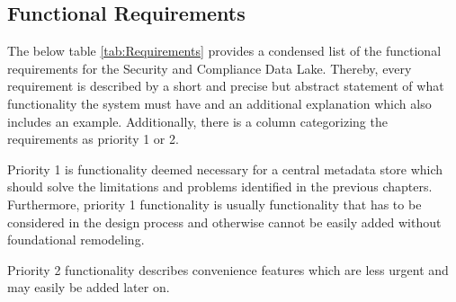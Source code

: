 \subsection{Functional Requirements}
The below table \ref{tab:Requirements} provides a condensed list of the functional requirements for the Security and Compliance Data Lake. Thereby, every requirement is described by a short and precise but abstract statement of what functionality the system must have and an additional explanation which also includes an example. Additionally, there is a column categorizing the requirements as priority 1 or 2.\par 
Priority 1 is functionality deemed necessary for a central metadata store which should solve the limitations and problems identified in the previous chapters. Furthermore, priority 1 functionality is usually functionality that has to be considered in the design process and otherwise cannot be easily added without foundational remodeling.\par
Priority 2 functionality describes convenience features which are less urgent and may easily be added later on.
